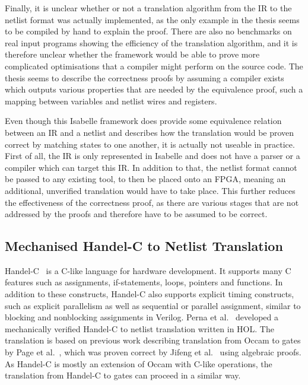 Finally, it is unclear whether or not a translation algorithm from the IR to the netlist format was
actually implemented, as the only example in the thesis seems to be compiled by hand to explain the
proof.  There are also no benchmarks on real input programs showing the efficiency of the
translation algorithm, and it is therefore unclear whether the framework would be able to prove more
complicated optimisations that a compiler might perform on the source code.  The thesis seems to
describe the correctness proofs by assuming a compiler exists which outputs various properties that
are needed by the equivalence proof, such a mapping between variables and netlist wires and
registers.

Even though this Isabelle framework does provide some equivalence relation between an IR and a
netlist and describes how the translation would be proven correct by matching states to one another,
it is actually not useable in practice.  First of all, the IR is only represented in Isabelle and
does not have a parser or a compiler which can target this IR.  In addition to that, the netlist
format cannot be passed to any existing tool, to then be placed onto an FPGA, meaning an additional,
unverified translation would have to take place.  This further reduces the effectiveness of the
correctness proof, as there are various stages that are not addressed by the proofs and therefore
have to be assumed to be correct.

\subsection{Mechanised Handel-C to Netlist Translation}%
\label{sec:wire-to-wire}

Handel-C~\cite{bowen98_handel_c_languag_refer_manual} is a C-like language for hardware development.
It supports many C features such as assignments, if-statements, loops, pointers and functions.  In
addition to these constructs, Handel-C also supports explicit timing constructs, such as explicit
parallelism as well as sequential or parallel assignment, similar to blocking and nonblocking
assignments in Verilog.  Perna et al.~\cite{perna12_mechan_wire_wise_verif_handel_c_synth} developed
a mechanically verified Handel-C to netlist translation written in HOL. The translation is based
on previous work describing translation from Occam to gates by Page et
al.~\cite{page91_compil_occam}, which was proven correct by Jifeng et al.~\cite{jifeng93_towar}
using algebraic proofs.  As Handel-C is mostly an extension of Occam with C-like operations, the
translation from Handel-C to gates can proceed in a similar way.

